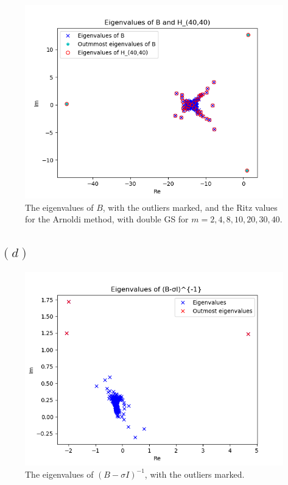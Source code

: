 \begin{figure}[h!]
\includegraphics[scale=0.4]{../task6/task6c_m40.png}

\caption{The eigenvalues of $B$, with the outliers marked, and the Ritz values for the Arnoldi method, with double GS for $m = 2, 4, 8, 10, 20, 30, 40$.}
\label{fig:task6c2}
\end{figure}

\subsection{$(d)$}
\begin{figure}[h!]
\centering
\includegraphics[scale=0.8]{../task6/task6d.png}
\caption{The eigenvalues of $(B-\sigma I )^{-1}$, with the outliers marked.}
\label{fig:task6d}
\end{figure}
